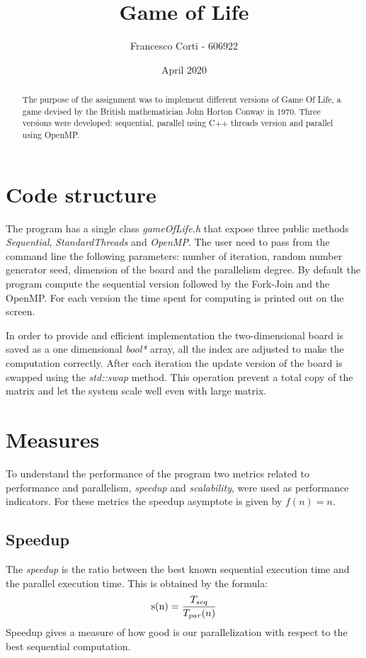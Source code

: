 \documentclass[a4paper,10pt]{article}
\title{Game of Life}
\author{Francesco Corti - 606922}
\date{April 2020}
\begin{document}
		\maketitle
		\begin{abstract}
			The purpose of the assignment was to implement different versions of Game Of Life, a game devised by the British mathematician John Horton Conway in 1970.
			Three versions were developed: sequential, parallel using C++ threads version and parallel using OpenMP. 
		\end{abstract}
\vspace{0.3cm}

\section{Code structure}
The program has a single class \textit{gameOfLife.h} that expose three public methods \textit{Sequential}, \textit{StandardThreads} and \textit{OpenMP}. The user need to pass from the command line the following parameters: number of iteration, random number generator seed, dimension of the board and the parallelism degree. By default the program compute the sequential version followed by the Fork-Join and the OpenMP. For each version the time spent for computing is printed out on the screen.

In order to provide and efficient implementation the two-dimensional board is saved as a one dimensional \textit{bool*} array, all the index are adjusted to make the computation correctly. After each iteration the update version of the board is swapped using the \textit{std::swap} method. This operation prevent a total copy of the matrix and let the system scale well even with large matrix.

\section{Measures}
To understand the performance of the program two metrics related to performance and parallelism, \textit{speedup} and \textit{scalability}, were used as performance indicators. For these metrics the speedup asymptote is given by $f(n) = n $. 
\subsection{Speedup}
The \textit{speedup} is the ratio between the best known sequential execution time and the parallel execution time. This is obtained by the formula:
\begin{equation}
\textnormal{s(n)} = \frac{T_{seq}}{T_{par}(n)}
\end{equation}
Speedup gives a measure of how good is our parallelization with respect to the best sequential computation.
\end{document}
